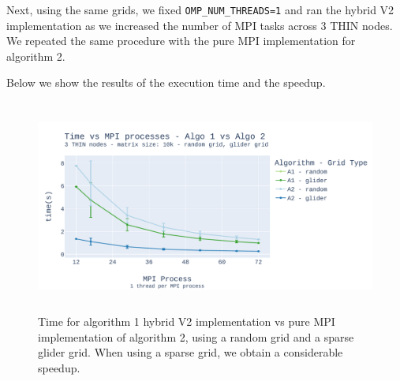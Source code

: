 \documentclass{report}
\begin{document}

Next, using the same grids, we fixed \texttt{OMP\_NUM\_THREADS=1} and ran the 
hybrid V2 implementation as we increased the number of MPI tasks across 3 THIN 
nodes. We repeated the same procedure with the pure MPI implementation for 
algorithm 2.

Below we show the results of the execution time and the speedup.

\begin{figure}[H]
\centering
\includegraphics[width=14cm, height=7cm]{./images/a1_v_a2_static_grid_010k.pdf}
\caption{\label{fig:strongmpiepychybrid} Time for algorithm 1 hybrid V2 implementation 
vs pure MPI implementation of algorithm 2, using a random grid and a sparse glider grid. When 
using a sparse grid, we obtain a considerable speedup.}
\end{figure}


\printbibliography
\end{document}
